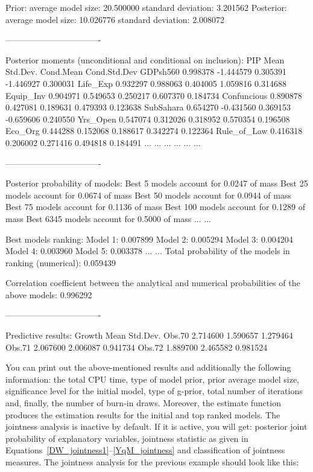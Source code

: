 \begin{CodeChunk}
	\begin{CodeOutput}
Prior:
    average model size: 20.500000
    standard deviation: 3.201562
Posterior:
    average model size: 10.026776
    standard deviation: 2.008072

----------------------------------
		
Posterior moments (unconditional and conditional on inclusion):
PIP         Mean     Std.Dev.    Cond.Mean   Cond.Std.Dev        
GDPsh560    0.998378    -1.444579     0.305391    -1.446927       0.300031
Life_Exp    0.932297     0.988063     0.404005     1.059816       0.314688
Equip_Inv   0.904971     0.549653     0.250217     0.607370       0.184734
Confuncious 0.890878     0.427081     0.189631     0.479393       0.123638
SubSahara   0.654270    -0.431560     0.369153    -0.659606       0.240550
Yrs_Open    0.547074     0.312026     0.318952     0.570354       0.196508
Eco_Org     0.444288     0.152068     0.188617     0.342274       0.122364
Rule_of_Law 0.416318     0.206002     0.271416     0.494818       0.184491
...         ...          ...          ...          ...            ...

----------------------------------

Posterior probability of models:
Best 5   models account for 0.0247 of mass
Best 25  models account for 0.0674 of mass
Best 50  models account for 0.0944 of mass
Best 75  models account for 0.1136 of mass
Best 100 models account for 0.1289 of mass
Best 6345 models account for 0.5000 of mass
...         ...

Best models ranking:
Model 1:	0.007899
Model 2:	0.005294
Model 3:	0.004204
Model 4:	0.003960
Model 5:	0.003378
...         ...
Total probability of the models in ranking (numerical): 0.059439

Correlation coefficient between the analytical
and numerical probabilities of the above models: 0.996292

----------------------------------

Predictive results:
Growth       Mean   Std.Dev.
Obs.70    2.714600   1.590657   1.279464
Obs.71    2.067600   2.006087   0.941734
Obs.72    1.889700   2.465582   0.981524
	\end{CodeOutput}
\end{CodeChunk}

You can print out the
above-mentioned results and additionally the following information:
the total CPU time, type of model prior, prior average model size,
significance level for the initial model, type of g-prior, total
number of iterations and, finally, the number of burn-in
draws. Moreover, the  estimate function produces the estimation
results for the initial and top ranked models. The jointness analysis
is inactive by default. If it is active, you will get: posterior joint
probability of explanatory variables, jointness statistic as given in
Equations~\ref{DW_jointness1}--\ref{YqM_jointness} and classification
of jointness measures.  The jointness analysis for the previous
example should look like this:

